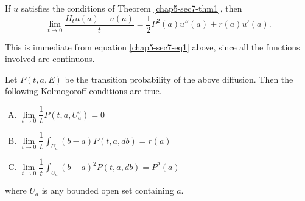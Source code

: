 \begin{thm}\label{chap5-sec7-thm2}%
If $u$ satisfies the conditions of Theorem \ref{chap5-sec7-thm1}, then
$$
\lim\limits_{t \rightarrow 0} \frac{H_t u(a) - u (a)}{t} =
\frac{1}{2} P^2 (a) u'' (a) + r(a) u' (a). 
$$
\end{thm}

This is immediate from equation \eqref{chap5-sec7-eq1} above, since all the functions
involved are continuous. 

\begin{thm}\label{chap5-sec7-thm3}%
  Let $P(t, a, E)$ be the transition probability of the above
  diffusion. Then the following Kolmogoroff conditions are  true.
  \begin{enumerate}[(A)]
  \item $\lim\limits_{t \rightarrow 0} \dfrac{1}{t} P(t, a, U^c_a) = 0$
  \item $\lim\limits_{t \rightarrow 0} \dfrac{1}{t} \int_{U_a} (b-a)
    P(t, a, db) = r(a)$ 
  \item $\lim\limits_{t \rightarrow 0} \dfrac{1}{t} \int_{U_a} (b-a)^2
    P(t, a, db) = P^2(a)$ 
  \end{enumerate}
  where $U_a$ is any bounded open set containing $a$.
\end{thm}

